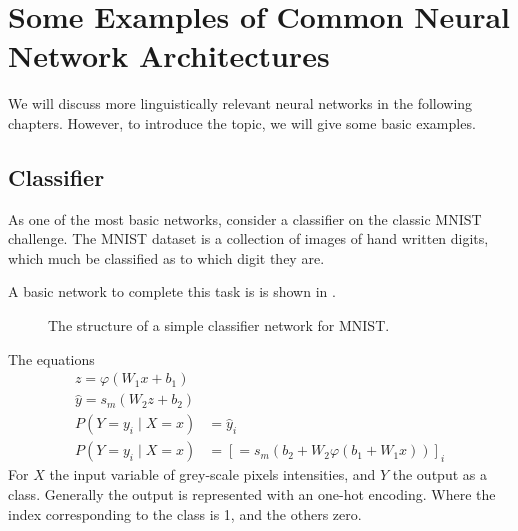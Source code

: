 \documentclass[12pt,parskip]{komatufte}
\begin{document}





\section{Some Examples of Common Neural Network Architectures}
We will discuss more linguistically relevant neural networks in the following chapters.
However, to introduce the topic, we will give some basic examples.


\subsection{Classifier}\label{sec:classifier}
As one of the most basic networks, consider a classifier on the classic MNIST challenge.
The MNIST dataset is a collection of images of hand written digits, which much be classified as to which digit they are.

A basic network to complete this task is is shown in .

\begin{figure}
	\caption{The structure of a simple classifier network for MNIST. \label{fig:mnistnetwork}}
	
\end{figure}

The equations
\begin{align}
z=\varphi(W_1 x+b_1) \\
\hat{y}=s_m(W_2 z + b_2) \\
P(Y=y_i\mid X=x) &= \hat{y}_i \\
P(Y=y_i\mid X=x) &= \left[=s_m(b_2 + W_2 \varphi(b_1 + W_1 x))\right]_i
\end{align}
For $X$ the input variable of grey-scale pixels intensities, and $Y$ the output as a class.
Generally the output is represented with an one-hot encoding.
Where the index corresponding to the class is 1, and the others zero.
\end{document}
